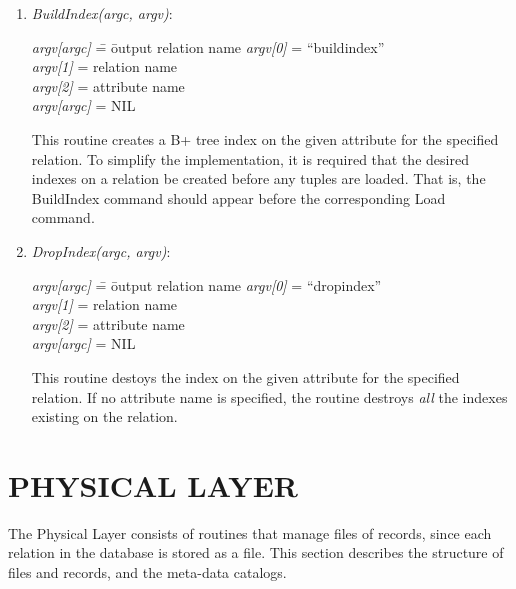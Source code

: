 \begin{enumerate}
\item\emph{BuildIndex(argc, argv)}:
\begin{tabbing}
\hspace*{0.2in}\emph{argv[argc]} \= = \= output relation name  \kill
\hspace*{0.2in}\emph{argv[0]}    \> = \> ``buildindex''		 \\
\hspace*{0.2in}\emph{argv[1]}    \> = \> relation name  \\
\hspace*{0.2in}\emph{argv[2]}    \> = \> attribute name        \\
\hspace*{0.2in}\emph{argv[argc]} \> = \> NIL
\end{tabbing}

This routine creates a B+ tree index on the given attribute
for the specified relation.  To simplify the implementation, 
it is required that the desired indexes on a relation be
created before any tuples are loaded.  That is, the BuildIndex
command should appear before the corresponding Load command.

\item\emph{DropIndex(argc, argv)}:
\begin{tabbing}
\hspace*{0.2in}\emph{argv[argc]} \= = \= output relation name  \kill
\hspace*{0.2in}\emph{argv[0]}    \> = \> ``dropindex''		 \\
\hspace*{0.2in}\emph{argv[1]}    \> = \> relation name  \\
\hspace*{0.2in}\emph{argv[2]}    \> = \> attribute name        \\
\hspace*{0.2in}\emph{argv[argc]} \> = \> NIL
\end{tabbing}

This routine destoys the index on the given attribute for the
specified relation.  If no attribute name is specified, the
routine destroys \emph{all} the indexes existing on the relation.

\end{enumerate}


\section{PHYSICAL LAYER}
The Physical Layer consists of routines that manage files of records,
since each relation in the database is stored as a file. This
section describes the structure of files and records, and the
meta-data catalogs.

